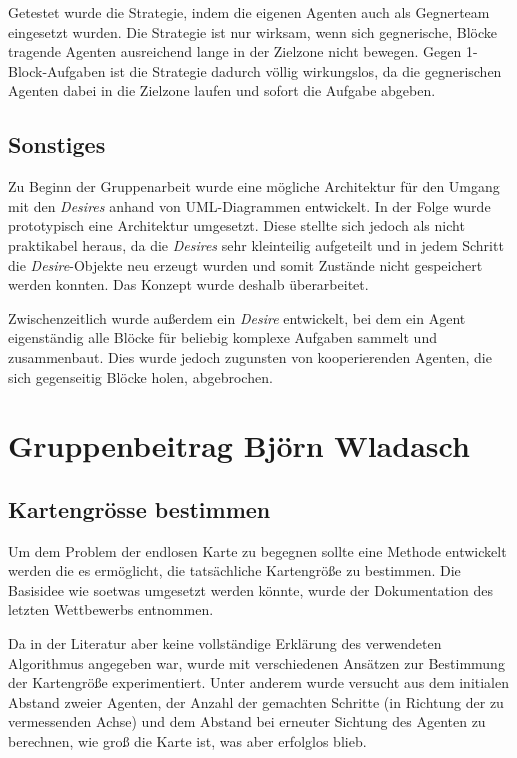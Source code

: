 \documentclass[runningheads]{llncs}
\begin{document}
Getestet wurde die Strategie, indem die eigenen Agenten auch als Gegnerteam eingesetzt wurden. Die Strategie ist nur wirksam, wenn sich gegnerische, Blöcke tragende Agenten ausreichend lange in der Zielzone nicht bewegen. Gegen 1-Block-Aufgaben ist die Strategie dadurch völlig wirkungslos, da die gegnerischen Agenten dabei in die Zielzone laufen und sofort die Aufgabe abgeben.

\subsection{Sonstiges}
Zu Beginn der Gruppenarbeit wurde eine mögliche Architektur für den Umgang mit den \textit{Desires} anhand von UML-Diagrammen entwickelt. In der Folge wurde prototypisch eine Architektur umgesetzt. Diese stellte sich jedoch als nicht praktikabel heraus, da die \textit{Desires} sehr kleinteilig aufgeteilt und in jedem Schritt die \textit{Desire}-Objekte neu erzeugt wurden und somit Zustände nicht gespeichert werden konnten. Das Konzept wurde deshalb überarbeitet.

Zwischenzeitlich wurde außerdem ein \textit{Desire} entwickelt, bei dem ein Agent eigenständig alle Blöcke für beliebig komplexe Aufgaben sammelt und zusammenbaut. Dies wurde jedoch zugunsten von kooperierenden Agenten, die sich gegenseitig Blöcke holen, abgebrochen.

\section{Gruppenbeitrag Björn Wladasch}
\subsection{Kartengrösse bestimmen}
Um dem Problem der endlosen Karte zu begegnen sollte eine Methode entwickelt werden die es ermöglicht, die tatsächliche Kartengröße zu bestimmen. Die Basisidee wie soetwas umgesetzt werden könnte, wurde der Dokumentation des letzten Wettbewerbs \cite{MAPC2021} entnommen.  

Da in der Literatur aber keine vollständige Erklärung des verwendeten Algorithmus angegeben war, wurde mit verschiedenen Ansätzen zur Bestimmung der Kartengröße experimentiert. Unter anderem wurde versucht aus dem initialen Abstand zweier Agenten, der Anzahl der gemachten Schritte (in Richtung der zu vermessenden Achse) und dem Abstand bei erneuter Sichtung des Agenten zu berechnen, wie groß die Karte ist, was aber erfolglos blieb.
\end{document}
